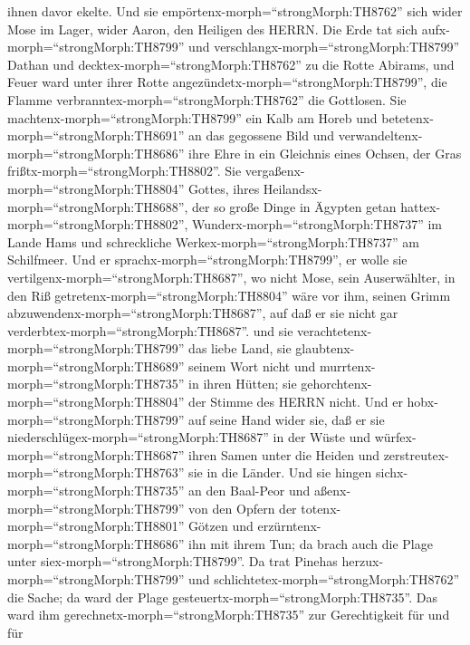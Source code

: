 ihnen davor ekelte.  Und sie
empörtenx-morph=``strongMorph:TH8762'' sich wider Mose im Lager, wider
Aaron, den Heiligen des HERRN.  Die Erde tat sich
aufx-morph=``strongMorph:TH8799'' und
verschlangx-morph=``strongMorph:TH8799'' Dathan und
decktex-morph=``strongMorph:TH8762'' zu die Rotte Abirams, 
und Feuer ward unter ihrer Rotte
angezündetx-morph=``strongMorph:TH8799'', die Flamme
verbranntex-morph=``strongMorph:TH8762'' die Gottlosen. 
Sie machtenx-morph=``strongMorph:TH8799'' ein Kalb am Horeb und
betetenx-morph=``strongMorph:TH8691'' an das gegossene Bild
 und verwandeltenx-morph=``strongMorph:TH8686'' ihre Ehre
in ein Gleichnis eines Ochsen, der Gras
frißtx-morph=``strongMorph:TH8802''.  Sie
vergaßenx-morph=``strongMorph:TH8804'' Gottes, ihres
Heilandsx-morph=``strongMorph:TH8688'', der so große Dinge in Ägypten
getan hattex-morph=``strongMorph:TH8802'', 
Wunderx-morph=``strongMorph:TH8737'' im Lande Hams und schreckliche
Werkex-morph=``strongMorph:TH8737'' am Schilfmeer.  Und er
sprachx-morph=``strongMorph:TH8799'', er wolle sie
vertilgenx-morph=``strongMorph:TH8687'', wo nicht Mose, sein
Auserwählter, in den Riß getretenx-morph=``strongMorph:TH8804'' wäre vor
ihm, seinen Grimm abzuwendenx-morph=``strongMorph:TH8687'', auf daß er
sie nicht gar verderbtex-morph=``strongMorph:TH8687''.  und
sie verachtetenx-morph=``strongMorph:TH8799'' das liebe Land, sie
glaubtenx-morph=``strongMorph:TH8689'' seinem Wort nicht 
und murrtenx-morph=``strongMorph:TH8735'' in ihren Hütten; sie
gehorchtenx-morph=``strongMorph:TH8804'' der Stimme des HERRN nicht.
 Und er hobx-morph=``strongMorph:TH8799'' auf seine Hand
wider sie, daß er sie niederschlügex-morph=``strongMorph:TH8687'' in der
Wüste  und würfex-morph=``strongMorph:TH8687'' ihren Samen
unter die Heiden und zerstreutex-morph=``strongMorph:TH8763'' sie in die
Länder.  Und sie hingen sichx-morph=``strongMorph:TH8735''
an den Baal-Peor und aßenx-morph=``strongMorph:TH8799'' von den Opfern
der totenx-morph=``strongMorph:TH8801'' Götzen  und
erzürntenx-morph=``strongMorph:TH8686'' ihn mit ihrem Tun; da brach auch
die Plage unter siex-morph=``strongMorph:TH8799''.  Da trat
Pinehas herzux-morph=``strongMorph:TH8799'' und
schlichtetex-morph=``strongMorph:TH8762'' die Sache; da ward der Plage
gesteuertx-morph=``strongMorph:TH8735''.  Das ward ihm
gerechnetx-morph=``strongMorph:TH8735'' zur Gerechtigkeit für und für
